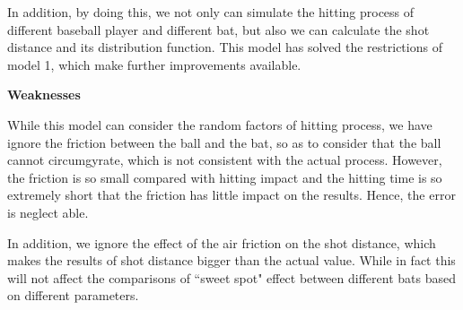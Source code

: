 In addition, by doing this, we not only can simulate the hitting process of different baseball player and different bat, but also we can calculate the shot distance and its distribution function. This model has solved the restrictions of model 1, which make further improvements available.

\textbf{Weaknesses}

While this model can consider the random factors of hitting process, we have ignore the friction between the ball and the bat, so as to consider that the ball cannot circumgyrate, which is not consistent with the actual process. However, the friction is so small compared with hitting impact and the hitting time is so extremely short that the friction has little impact on the results. Hence, the error is neglect able.

In addition, we ignore the effect of the air friction on the shot distance, which makes the results of shot distance bigger than the actual value. While in fact this will not affect the comparisons of ``sweet spot" effect between different bats based on different parameters.


